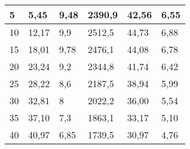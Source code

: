 \begin{table}[H]
\begin{tabular}{|l|l|l|l|l|l|}
    \rowcolor[HTML]{C6E0B4} 
    5                                     & 5,45                                   & 9,48                                               & 2390,9                                   & 42,56                                          & 6,55                                    \\ \hline
    \rowcolor[HTML]{E2EFDA} 
    10                                    & 12,17                                  & 9,9                                                & 2512,5                                   & 44,73                                          & 6,88                                    \\ \hline
    \rowcolor[HTML]{C6E0B4} 
    15                                    & 18,01                                  & 9,78                                               & 2476,1                                   & 44,08                                          & \cellcolor[HTML]{FFC000}6,78                                    \\ \hline
    \rowcolor[HTML]{E2EFDA} 
    20                                    & 23,24                                  & 9,2                                                & 2344,8                                   & 41,74                                          & 6,42                                     \\ \hline
    \rowcolor[HTML]{C6E0B4} 
    25                                    & 28,22                                  & 8,6                                                & 2187,5                                   & 38,94                                          & 5,99                                    \\ \hline
    \rowcolor[HTML]{E2EFDA} 
    30                                    & 32,81                                  & 8                                                  & 2022,2                                   & 36,00                                           & 5,54                                     \\ \hline
    \rowcolor[HTML]{C6E0B4} 
    35                                    & 37,10                                 & 7,3                                                & 1863,1                                   & 33,17                                          & 5,10                                    \\ \hline
    \rowcolor[HTML]{E2EFDA} 
    40                                    & 40,97                                  & 6,85                                               & 1739,5                                   & 30,97                                          & 4,76                                    \\ \hline

\end{tabular}
\end{table}
